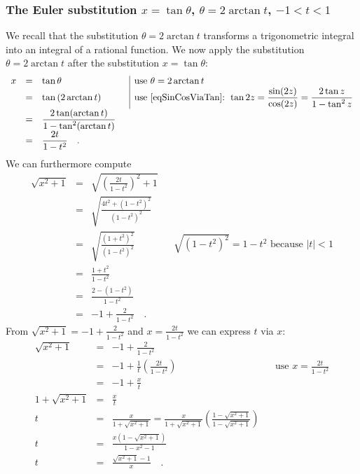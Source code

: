 \documentclass[12pt]{book}
\begin{document}
\subsubsection{The Euler substitution $x=\tan \theta$, $\theta=2\arctan t$, $-1<  t< 1$}
We recall that the substitution $\theta=2\arctan t$ transforms a trigonometric integral into an integral of a rational function. We now apply the substitution $\theta=2\arctan t$ after the substitution $x=\tan\theta$:
\[
\begin{array}{rcll|l}
x&=&\displaystyle \tan \theta &&\text{use } \theta=2\arctan t \\
&=&\displaystyle \tan \left(2\arctan t\right)&&\displaystyle  \text{use \eqref{eqSinCosViaTan}: } \tan 2z=\frac{\sin (2z)}{\cos (2z)}=\frac{2\tan z}{1-\tan^2 z}\\
&=&\displaystyle \frac{2\tan (\arctan t)}{1-\tan^2 (\arctan t)}\\
&=&\displaystyle \frac{2t}{1-t^2}\quad .
\end{array}
\]
We can furthermore compute
\begin{equation}\label{eqsqrtx2plus1Euler1}
\begin{array}{rcll|l}
\displaystyle \sqrt{x^2+1}&=&\displaystyle  \sqrt{ \left( \frac{ 2t}{1-t^2}\right)^2+1 }\\
&=&\displaystyle \sqrt{\frac{4t^2+(1-t^2)^2}{(1-t^2)^2} }\\
&=&\displaystyle \sqrt{\frac{(1+t^2)^2}{(1-t^2)^2}} && \sqrt{(1-t^2)^2 } = 1-t^2  \text{ because } |t|<1\\
&=&\displaystyle \frac{1+t^2}{1-t^2}\\
&=&\displaystyle \frac{2-(1-t^2)}{1-t^2}\\
&=&\displaystyle -1+ \frac{2 }{1-t^2 } \quad .
\end{array}
\end{equation}
From $\displaystyle \sqrt{x^2+1}=-1+\frac{2}{1-t^2}$ and $\displaystyle x=\frac{2t}{1-t^2}$ we can express $t$ via $x$:
\[
\begin{array}{rcll|l}
\displaystyle \sqrt{x^2+1}&=&\displaystyle -1+ \frac{2}{ 1 - t^2 }\\
&=&\displaystyle -1+\frac{1}{t}\left(\frac{2t}{1 -t^2} \right) &&\displaystyle \text{use } x= \frac{2t}{1-t^2}\\
&=&\displaystyle -1+\frac{x}{t}\\
\displaystyle 1+\sqrt{x^2+1}&=&\displaystyle \frac{x}{t}\\
\displaystyle t&=&\displaystyle \frac{x}{1+\sqrt{x^2+1}} =\frac{x}{1+\sqrt{x^2+1}} \left(\frac{ 1-\sqrt{x^2+1} }{1 - \sqrt{ x^2+1}}\right)\\
\displaystyle t&=& \displaystyle  \frac{x(1- \sqrt{x^2 +1 } ) }{ 1- x^2-1}\\
\displaystyle t&=&\displaystyle \frac{\sqrt{x^2+1}-1}{x}\quad .
\end{array}
\]
\end{document}
